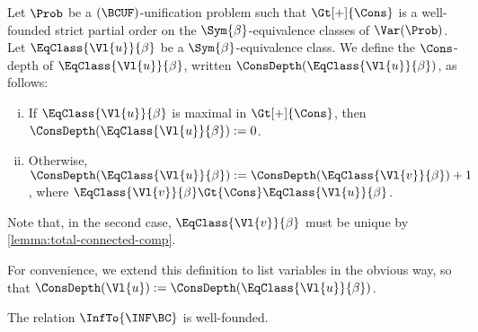 \begin{Definition}
    Let $\Prob$ be a $(\BCUF)$-unification problem such that $\Gt[+]{\Cons}$ is
    a well-founded strict partial order on the $\Sym{\beta}$-equivalence
    classes of $\Var(\Prob)$. Let $\EqClass{\Vl{u}}{\beta}$ be a
    $\Sym{\beta}$-equivalence class. We define the $\Cons$-depth of
    $\EqClass{\Vl{u}}{\beta}$, written $\ConsDepth(\EqClass{\Vl{u}}{\beta})$, as
    follows:
    \begin{enumerate}[(i)]
        \item If $\EqClass{\Vl{u}}{\beta}$ is maximal in $\Gt[+]{\Cons}$, then
            $\ConsDepth(\EqClass{\Vl{u}}{\beta}) := 0$.
        \item Otherwise, $\ConsDepth(\EqClass{\Vl{u}}{\beta}) :=
            \ConsDepth(\EqClass{\Vl{v}}{\beta}) + 1$, where $\EqClass{\Vl{v}}{\beta}
            \Gt{\Cons} \EqClass{\Vl{u}}{\beta}$.
    \end{enumerate}
    Note that, in the second case, $\EqClass{\Vl{v}}{\beta}$ must be unique by
    \cref{lemma:total-connected-comp}.

    For convenience, we extend this definition to list variables in the obvious
    way, so that $\ConsDepth(\Vl{u}) := \ConsDepth(\EqClass{\Vl{u}}{\beta})$.
\end{Definition}

\begin{Theorem}\label{lemma:inf-bc-terminates}
    The relation $\InfTo{\INF\BC}$ is well-founded.
\end{Theorem}

